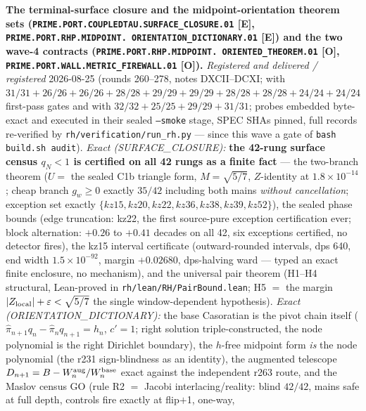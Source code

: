 \documentclass[11pt,a4paper]{article}
\begin{document}
\par\smallskip\noindent\textbf{The terminal-surface closure and
the midpoint-orientation theorem sets
(\texttt{PRIME.PORT.COUPLEDTAU.\allowbreak SURFACE\_CLOSURE.01}
[E], \texttt{PRIME.PORT.RHP.MIDPOINT.\allowbreak
ORIENTATION\_DICTIONARY.01} [E]) and the two wave-4 contracts
(\texttt{PRIME.PORT.RHP.MIDPOINT.\allowbreak
ORIENTED\_THEOREM.01} [O],
\texttt{PRIME.PORT.WALL.\allowbreak METRIC\_FIREWALL.01} [O]).}
{\sloppy
\emph{Registered and delivered / registered} 2026-08-25 (rounds
260--278, notes DXCII--DCXI;
 with $31/31 + 26/26 +
26/26 + 28/28 + 29/29 + 29/29 + 28/28 + 28/28 + 24/24 + 24/24$
first-pass gates and
 with $32/32 +
25/25 + 29/29 + 31/31$; probes embedded byte-exact and executed
in their sealed \texttt{--smoke} stage, SPEC SHAs pinned, full
records re-verified by \texttt{rh/verification/run\_rh.py} ---
since this wave a gate of \texttt{bash build.sh audit}).
\emph{Exact (SURFACE\_CLOSURE):} \textbf{the 42-rung surface
census $q_N < 1$ is certified on all 42 rungs as a finite fact}
--- the two-branch theorem ($U =$ the sealed C1b triangle form,
$M = \sqrt{5/7}$, $Z$-identity at $1.8\times10^{-14}$; cheap
branch $g_w \ge 0$ exactly $35/42$ including both mains
\emph{without cancellation}; exception set exactly $\{kz15, kz20,
kz22, kz36, kz38, kz39, kz52\}$), the sealed phase bounds (edge
truncation: kz22, the first source-pure exception certification
ever; block alternation: $+0.26$ to $+0.41$ decades on all 42,
six exceptions certified, no detector fires), the kz15 interval
certificate (outward-rounded intervals, dps 640, end width
$1.5\times10^{-92}$, margin $+0.02680$, dps-halving ward ---
typed an exact finite enclosure, no mechanism), and the universal
pair theorem (H1--H4 structural, Lean-proved in
\texttt{rh/lean/RH/PairBound.lean}; H5 $=$ the margin
$|Z_{\rm local}| + \varepsilon < \sqrt{5/7}$ the single
window-dependent hypothesis).  \emph{Exact
(ORIENTATION\_DICTIONARY):} the base Casoratian is the pivot
chain itself ($\hat\pi_{n+1}q_n - \hat\pi_nq_{n+1} = h_n$, $c' =
1$; right solution triple-constructed, the node polynomial is the
right Dirichlet boundary), the $h$-free midpoint form \emph{is}
the node polynomial (the r231 sign-blindness as an identity), the
augmented telescope $D_{n+1} = B - W^{\rm aug}_n/W^{\rm base}_n$
exact against the independent r263 route, and the Maslov census
GO (rule R2 $=$ Jacobi interlacing/reality: blind $42/42$, mains
safe at full depth, controls fire exactly at flip$+$1, one-way,
}
\end{document}
